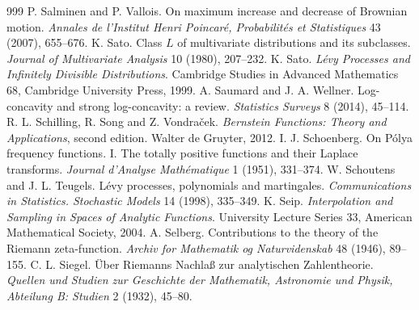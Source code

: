 \begin{thebibliography}{999}
 P. Salminen and P. Vallois. On maximum increase and decrease of Brownian motion. \emph{Annales de l'Institut Henri Poincar\'e, Probabilit\'es et Statistiques} 43 (2007), 655--676.
 K. Sato. Class $L$ of multivariate distributions and its subclasses. \emph{Journal of Multivariate Analysis} 10 (1980), 207--232.
 K. Sato. \emph{L\'evy Processes and Infinitely Divisible Distributions}. Cambridge Studies in Advanced Mathematics 68, Cambridge University Press, 1999.
 A. Saumard and J. A. Wellner. Log-concavity and strong log-concavity: a review. \emph{Statistics Surveys} 8 (2014), 45--114.
 R. L. Schilling, R. Song and Z. Vondra\v{c}ek. \emph{Bernstein Functions: Theory and Applications}, second edition. Walter de Gruyter, 2012.
 I. J. Schoenberg. On P\'olya frequency functions. I. The totally positive functions and their Laplace transforms. \emph{Journal d'Analyse Math\'ematique} 1 (1951), 331--374.
 W. Schoutens and J. L. Teugels. L\'evy processes, polynomials and martingales. \emph{Communications in Statistics. Stochastic Models} 14 (1998), 335--349.
 K. Seip. \emph{Interpolation and Sampling in Spaces of Analytic Functions}. University Lecture Series 33, American Mathematical Society, 2004.
 A. Selberg. Contributions to the theory of the Riemann zeta-function. \emph{Archiv for Mathematik og Naturvidenskab} 48 (1946), 89--155.
 C. L. Siegel. \"Uber Riemanns Nachla{\ss} zur analytischen Zahlentheorie. \emph{Quellen und Studien zur Geschichte der Mathematik, Astronomie und Physik, Abteilung B: Studien} 2 (1932), 45--80.

\end{thebibliography}
